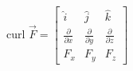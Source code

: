 \documentclass[preview]{standalone}
\begin{document}
\begin{center}
curl $\vec{F} = \begin{bmatrix} \hat{i} & \hat{j} & \hat{k}\\ \frac{\partial}{\partial x} & \frac{\partial}{\partial y} & \frac{\partial}{\partial z}\\ F_{x} & F_{y} & F_{z} \end{bmatrix}$
\end{center}
\end{document}
